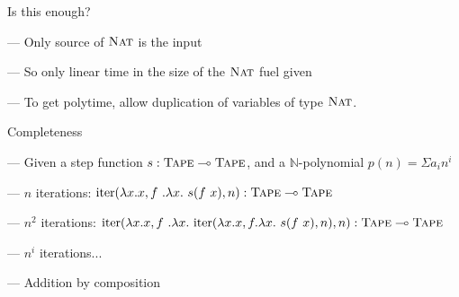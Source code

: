 \documentclass[xetex,serif,mathserif,aspectratio=169]{beamer}
\newcommand{\youtem}{\quad \textcolor{titlered!80}{---} \quad}
\newcommand{\HEAD}[1]{\textcolor{titlered}{#1}}
\begin{document}
\begin{frame}
  \HEAD{Is this enough?}

  \bigskip

  \youtem Only source of $\textsc{Nat}$ is the input

  \smallskip

  \youtem So only linear time in the size of the $\textsc{Nat}$ fuel given

  \smallskip

  \youtem To get polytime, allow duplication of variables of type $\textsc{Nat}$.

  \bigskip
  \pause

  \HEAD{Completeness}

  \medskip

  \youtem Given a step function $s : \textsc{Tape} \multimap \textsc{Tape}$, and a $\mathbb{N}$-polynomial $p(n) = \Sigma a_i n^i$

  \smallskip

  \youtem $n$ iterations: $\mathrm{iter}(\lambda x.x, f~.\lambda x.~s(f~x), n) : \textsc{Tape} \multimap \textsc{Tape}$

  \smallskip

  \youtem $n^2$ iterations: $\mathrm{iter}(\lambda x.x, f~.\lambda x.~\mathrm{iter}(\lambda x.x, f.\lambda x.~s(f~x),n), n) : \textsc{Tape} \multimap \textsc{Tape}$

  \smallskip

  \youtem $n^i$ iterations...

  \smallskip

  \youtem Addition by composition
\end{frame}
\end{document}
